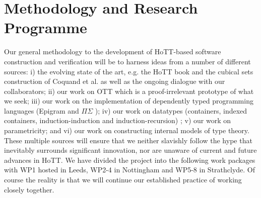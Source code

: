 \documentclass[a4paper,11pt]{article}
\begin{document}





\section{Methodology and Research Programme}



Our general methodology to the development of HoTT-based software
construction and verification will be to harness ideas from a number
of different sources: i) the evolving state of the art, e.g. the HoTT
book and the cubical sets construction of Coquand et al. as well as
the ongoing dialogue with our collaborators; ii) our work on OTT which
is a proof-irrelevant prototype of what we seek; iii) our work on the
implementation of dependently typed programming languages (Epigram and
$\Pi\Sigma$ \cite{alti:pisigma-new,alti:checking}); iv) our work on datatypes (containers, indexed
containers, induction-induction and induction-recursion) 
\cite{alti:fossacs03,alti:tlca03,alti:icalp04,alti:jpartial,alti:mpc04,alti:cont-tcs,alti:regular,alti:cats07,alti:jcats07,alti:lics09,
alti:catind2}
 ; v) our work
on parametricity; and vi) our work on constructing internal models of
type theory. These multiple sources will ensure that we neither
slavishly follow the hype that inevitably surrounds significant
innovation, nor are unaware of current and future advances in HoTT. We
have divided the project into the following work packages with WP1
hosted in Leeds, WP2-4 in Nottingham and WP5-8 in Strathclyde. Of course
the reality is that we will continue our established practice of
working closely together.

\end{document}
